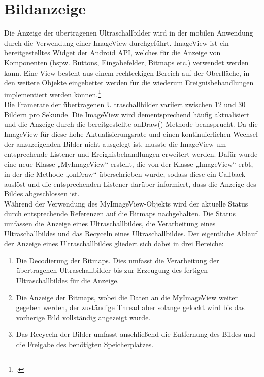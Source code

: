 \section{Bildanzeige}
Die Anzeige der übertragenen Ultraschallbilder wird in der mobilen Anwendung durch die Verwendung einer ImageView durchgeführt. ImageView ist ein bereitgestelltes Widget der Android API, welches für die Anzeige von Komponenten (bspw. Buttons, Eingabefelder, Bitmaps etc.) verwendet werden kann. Eine View besteht aus einem rechteckigen Bereich auf der Oberfläche, in den weitere Objekte eingebettet werden für die wiederum Ereignisbehandlungen implementiert werden können.\footcite{ImageView} \\
Die Framerate der übertragenen Ultraschallbilder variiert zwischen 12 und 30 Bildern pro Sekunde. Die ImageView wird dementsprechend häufig aktualisiert und die Anzeige durch die bereitgestellte onDraw()-Methode beansprucht. Da die ImageView für diese hohe Aktualisierungsrate und einen kontinuierlichen Wechsel der anzuzeigenden Bilder nicht ausgelegt ist, musste die ImageView um entsprechende Listener und Ereignisbehandlungen erweitert werden. 
Dafür wurde eine neue Klasse „MyImageView“ erstellt, die von der Klasse „ImageView“ erbt, in der die Methode „onDraw“ überschrieben wurde, sodass diese ein Callback auslöst und die entsprechenden Listener darüber informiert, dass die Anzeige des Bildes abgeschlossen ist. \\
Während der Verwendung des MyImageView-Objekts wird der aktuelle Status durch entsprechende Referenzen auf die Bitmaps  nachgehalten. Die Status umfassen die Anzeige eines Ultraschallbildes, die Verarbeitung eines Ultraschallbildes und das Recyceln eines Ultraschallbildes. Der eigentliche Ablauf der Anzeige eines Ultraschallbildes gliedert sich dabei in drei Bereiche:

\begin{minipage}{\textwidth}
\begin{enumerate}
\item Die Decodierung der Bitmaps. Dies umfasst die Verarbeitung der übertragenen Ultraschallbilder bis zur Erzeugung des fertigen Ultraschallbildes für die Anzeige.
\item Die Anzeige der Bitmaps, wobei die Daten an die MyImageView weiter gegeben werden, der zuständige Thread aber solange gelockt wird bis das vorherige Bild vollständig angezeigt wurde. 
\item Das Recyceln der Bilder umfasst anschließend die Entfernung des Bildes und die Freigabe des benötigten Speicherplatzes. 
\end{enumerate}
\end{minipage}

